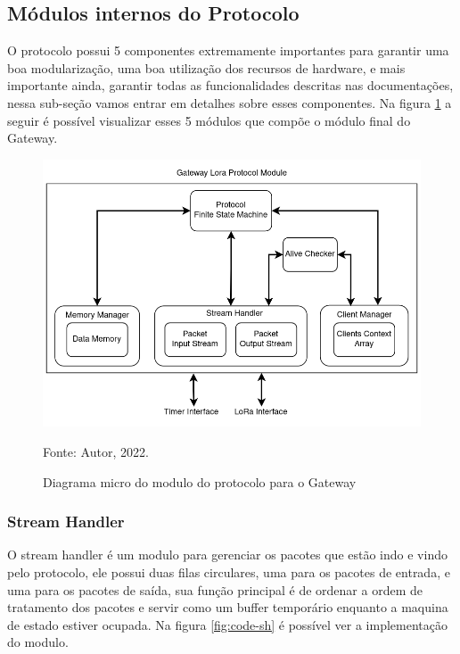 \subsection{Módulos internos do Protocolo}

O protocolo possui 5 componentes extremamente importantes para garantir uma boa modularização,
uma boa utilização dos recursos de hardware, e mais importante ainda, garantir todas as funcionalidades
descritas nas documentações, nessa sub-seção vamos entrar em detalhes sobre esses componentes. Na
figura \ref{fig:gw-blk} a seguir é possível visualizar esses 5 módulos que compõe o módulo final do
Gateway.

\begin{figure}[H]
    \centering
	\caption{Diagrama micro do modulo do protocolo para o Gateway}
    \includegraphics[height=0.3\textheight,keepaspectratio]{img/gw-block.drawio.png}
    \label{fig:gw-blk}
    
    Fonte: Autor, 2022.
\end{figure}

\subsubsection{Stream Handler}

O stream handler é um modulo para gerenciar os pacotes que estão indo e vindo pelo protocolo,
ele possui duas filas circulares, uma para os pacotes de entrada, e uma para os pacotes de saída,
sua função principal é de ordenar a ordem de tratamento dos pacotes e servir como um buffer temporário
enquanto a maquina de estado estiver ocupada. Na figura \ref{fig:code-sh} é possível ver a implementação
do modulo.

